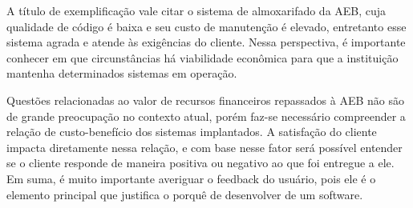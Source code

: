 	A título de exemplificação vale citar o sistema de almoxarifado da AEB, cuja qualidade de código é baixa e seu custo de manutenção é elevado, entretanto esse sistema agrada e atende às exigências do cliente. Nessa perspectiva, é importante conhecer em que circunstâncias há viabilidade econômica para que a instituição mantenha determinados sistemas em operação.

	Questões relacionadas ao valor de recursos financeiros repassados à AEB não são de grande preocupação no contexto atual, porém faz-se necessário compreender a relação de custo-benefício dos sistemas implantados. A satisfação do cliente impacta diretamente nessa relação, e com base nesse fator será possível entender se o cliente responde de maneira positiva ou negativo ao que foi entregue a ele.  Em suma, é muito importante averiguar o feedback do usuário, pois ele é o elemento principal que justifica o porquê de desenvolver de um software.
